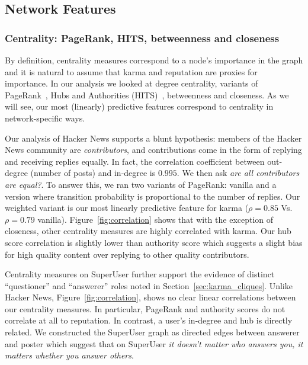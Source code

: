 \documentclass[11pt]{article}
\begin{document}
\subsection{Network Features}

\subsubsection{Centrality: PageRank, HITS, betweenness and closeness}
\label{sec:centrality}

By definition, centrality measures correspond to a node's importance in the
graph and it is natural to assume that karma and reputation are proxies for
importance. In our analysis we looked at degree centrality, variants of
PageRank~\cite{page1999pagerank}, Hubs and Authorities
(HITS)~\cite{kleinberg1999authoritative}, betweenness and closeness. As we will
see, our most (linearly) predictive features correspond to centrality in
network-specific ways.

Our analysis of Hacker News supports a blunt hypothesis: members of the Hacker
News community are \textit{contributors}, and contributions come in the form of
replying and receiving replies equally. In fact, the correlation coefficient
between out-degree (number of posts) and in-degree is $0.995$. We then ask
\textit{are all contributors are equal?}. To answer this, we ran two variants of
PageRank: vanilla and a version where transition probability is proportional to
the number of replies. Our weighted variant is our most linearly predictive
feature for karma ($\rho = 0.85$ Vs. $\rho=0.79$ vanilla).
Figure~\ref{fig:correlation} shows that with the exception of closeness, other
centrality measures are highly correlated with karma.  Our hub score correlation
is slightly lower than authority score which suggests a slight bias for high
quality content over replying to other quality contributors.

Centrality measures on SuperUser further support the evidence of distinct
``questioner'' and ``answerer'' roles noted in Section~\ref{sec:karma_cliques}.
Unlike Hacker News, Figure~\ref{fig:correlation}, shows no clear linear
correlations between our centrality measures. In particular, PageRank and
authority scores do not correlate at all to reputation. In contrast, a user's
in-degree and hub is directly related. We constructed the SuperUser graph as
directed edges between answerer and poster which suggest that on SuperUser
\textit{it doesn't matter who answers you, it matters whether you answer others}.
\end{document}
